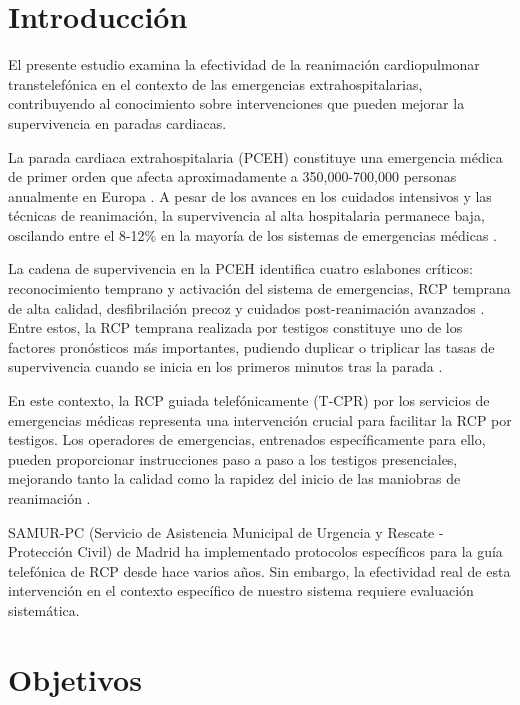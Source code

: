 \documentclass[10pt,a4paper]{article}
\begin{document}
\begin{multicols}{2}

\section{Introducción}

El presente estudio examina la efectividad de la reanimación cardiopulmonar transtelefónica en el contexto de las emergencias extrahospitalarias, contribuyendo al conocimiento sobre intervenciones que pueden mejorar la supervivencia en paradas cardiacas.

La parada cardiaca extrahospitalaria (PCEH) constituye una emergencia médica de primer orden que afecta aproximadamente a 350,000-700,000 personas anualmente en Europa \cite{ref1}. A pesar de los avances en los cuidados intensivos y las técnicas de reanimación, la supervivencia al alta hospitalaria permanece baja, oscilando entre el 8-12\% en la mayoría de los sistemas de emergencias médicas \cite{ref2}.

La cadena de supervivencia en la PCEH identifica cuatro eslabones críticos: reconocimiento temprano y activación del sistema de emergencias, RCP temprana de alta calidad, desfibrilación precoz y cuidados post-reanimación avanzados \cite{ref3}. Entre estos, la RCP temprana realizada por testigos constituye uno de los factores pronósticos más importantes, pudiendo duplicar o triplicar las tasas de supervivencia cuando se inicia en los primeros minutos tras la parada \cite{ref4}.

En este contexto, la RCP guiada telefónicamente (T-CPR) por los servicios de emergencias médicas representa una intervención crucial para facilitar la RCP por testigos. Los operadores de emergencias, entrenados específicamente para ello, pueden proporcionar instrucciones paso a paso a los testigos presenciales, mejorando tanto la calidad como la rapidez del inicio de las maniobras de reanimación \cite{ref5}.

SAMUR-PC (Servicio de Asistencia Municipal de Urgencia y Rescate - Protección Civil) de Madrid ha implementado protocolos específicos para la guía telefónica de RCP desde hace varios años. Sin embargo, la efectividad real de esta intervención en el contexto específico de nuestro sistema requiere evaluación sistemática.

\section{Objetivos}


\end{multicols}
\end{document}
